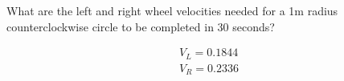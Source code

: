What are the left and right wheel velocities needed for a 1m radius counterclockwise circle to be completed in 30 seconds?

\begin{solution}
\begin{align*}
    V_L = 0.1844 \\
    V_R = 0.2336
\end{align*}
\end{solution}